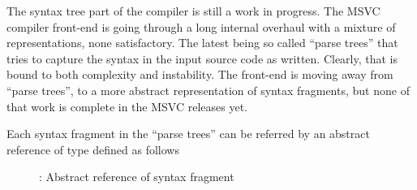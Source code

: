 \label{sec:ifc-syntax-tree-table}

The syntax tree part of the compiler is still a work in progress.  The MSVC compiler front-end is going through a long
internal overhaul with a mixture of representations, none satisfactory.  The latest being so called ``parse trees'' that tries
to capture the syntax in the input source code as written.  Clearly, that is bound to both complexity and instability.
The front-end is moving away from ``parse trees'', to a more abstract representation of syntax fragments, but none of that work is complete
in the MSVC releases yet.

Each syntax fragment in the ``parse trees'' can be referred by an abstract reference of type  defined
as follows
\begin{figure}[H]
	\centering
	\caption{: Abstract reference of syntax fragment}
	\label{fig:ifc-syntax-index}
\end{figure}

